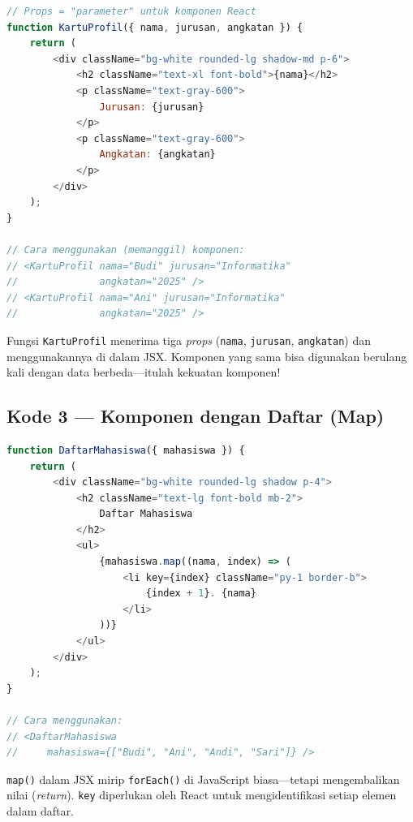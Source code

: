 \begin{lstlisting}[language=JavaScript, caption={Komponen yang menerima data melalui \emph{props}}, label={lst:13-komponen-props}]
// Props = "parameter" untuk komponen React
function KartuProfil({ nama, jurusan, angkatan }) {
    return (
        <div className="bg-white rounded-lg shadow-md p-6">
            <h2 className="text-xl font-bold">{nama}</h2>
            <p className="text-gray-600">
                Jurusan: {jurusan}
            </p>
            <p className="text-gray-600">
                Angkatan: {angkatan}
            </p>
        </div>
    );
}

// Cara menggunakan (memanggil) komponen:
// <KartuProfil nama="Budi" jurusan="Informatika"
//              angkatan="2025" />
// <KartuProfil nama="Ani" jurusan="Informatika"
//              angkatan="2025" />
\end{lstlisting}

\begin{tip}
Fungsi \texttt{KartuProfil} menerima tiga \emph{props} (\texttt{nama}, \texttt{jurusan}, \texttt{angkatan}) dan menggunakannya di dalam JSX. Komponen yang sama bisa digunakan berulang kali dengan data berbeda---itulah kekuatan komponen!
\end{tip}

\subsection{Kode 3 --- Komponen dengan Daftar (Map)}

\begin{lstlisting}[language=JavaScript, caption={Menampilkan daftar dengan \texttt{map()}}, label={lst:13-komponen-map}]
function DaftarMahasiswa({ mahasiswa }) {
    return (
        <div className="bg-white rounded-lg shadow p-4">
            <h2 className="text-lg font-bold mb-2">
                Daftar Mahasiswa
            </h2>
            <ul>
                {mahasiswa.map((nama, index) => (
                    <li key={index} className="py-1 border-b">
                        {index + 1}. {nama}
                    </li>
                ))}
            </ul>
        </div>
    );
}

// Cara menggunakan:
// <DaftarMahasiswa
//     mahasiswa={["Budi", "Ani", "Andi", "Sari"]} />
\end{lstlisting}

\begin{catatan}
\texttt{map()} dalam JSX mirip \texttt{forEach()} di JavaScript biasa---tetapi mengembalikan nilai (\emph{return}). \texttt{key} diperlukan oleh React untuk mengidentifikasi setiap elemen dalam daftar.
\end{catatan}

